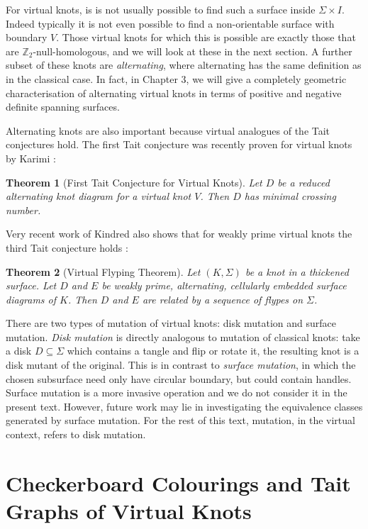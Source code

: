 \documentclass[12pt]{report}
\newcommand{\Z}{\mathbb{Z}}
\newtheorem*{theorem}{Theorem}
\begin{document}
For virtual knots, is is not usually possible to find such a surface inside $\Sigma \times I$. Indeed typically it is not even possible to find a non-orientable surface with boundary $V$. Those virtual knots for which this is possible are exactly those that are $\Z_{2}$-null-homologous, and we will look at these in the next section. A further subset of these knots are \textit{alternating}, where alternating has the same definition as in the classical case. In fact, in Chapter $3$, we will give a completely geometric characterisation of alternating virtual knots in terms of positive and negative definite spanning surfaces.

Alternating knots are also important because virtual analogues of the Tait conjectures hold. The first Tait conjecture was recently proven for virtual knots by Karimi \cite[Theorem 1.6]{alternating-virtual-knots}:

\begin{theorem}[First Tait Conjecture for Virtual Knots]
Let $D$ be a reduced alternating knot diagram for a virtual knot $V$. Then $D$ has minimal crossing number.
\end{theorem}

Very recent work of Kindred also shows that for weakly prime virtual knots the third Tait conjecture holds \cite[Theorem 4.18]{virtual-flyping-theorem}:

\begin{theorem}[Virtual Flyping Theorem]
Let $(K, \Sigma)$ be a knot in a thickened surface. Let $D$ and $E$ be weakly prime, alternating, cellularly embedded surface diagrams of $K$. Then $D$ and $E$ are related by a sequence of flypes on $\Sigma$.
\end{theorem}

There are two types of mutation of virtual knots: disk mutation and surface mutation. \textit{Disk mutation} is directly analogous to mutation of classical knots: take a disk $D \subseteq \Sigma$ which contains a tangle and flip or rotate it, the resulting knot is a disk mutant of the original. This is in contrast to \textit{surface mutation}, in which the chosen subsurface need only have circular boundary, but could contain handles. Surface mutation is a more invasive operation and we do not consider it in the present text. However, future work may lie in investigating the equivalence classes generated by surface mutation. For the rest of this text, mutation, in the virtual context, refers to disk mutation.

\section{Checkerboard Colourings and Tait Graphs of Virtual Knots}
\end{document}
